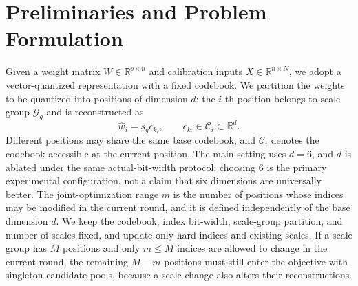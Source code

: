 \section{Preliminaries and Problem Formulation}

Given a weight matrix $W\in\mathbb R^{p\times n}$ and calibration inputs $X\in\mathbb R^{n\times N}$, we adopt a vector-quantized representation with a fixed codebook.
We partition the weights to be quantized into positions of dimension $d$; the $i$-th position belongs to scale group $\mathcal G_g$ and is reconstructed as
\begin{equation}
\widehat w_i=s_g c_{k_i},\qquad c_{k_i}\in\mathcal C_i\subset\mathbb R^d.
\label{eq:recon}
\end{equation}
Different positions may share the same base codebook, and $\mathcal C_i$ denotes the codebook accessible at the current position.
The main setting uses $d=6$, and $d$ is ablated under the same actual-bit-width protocol; choosing 6 is the primary experimental configuration, not a claim that six dimensions are universally better.
The joint-optimization range $m$ is the number of positions whose indices may be modified in the current round, and it is defined independently of the base dimension $d$.
We keep the codebook, index bit-width, scale-group partition, and number of scales fixed, and update only hard indices and existing scales.
If a scale group has $M$ positions and only $m\le M$ indices are allowed to change in the current round, the remaining $M-m$ positions must still enter the objective with singleton candidate pools, because a scale change also alters their reconstructions.

